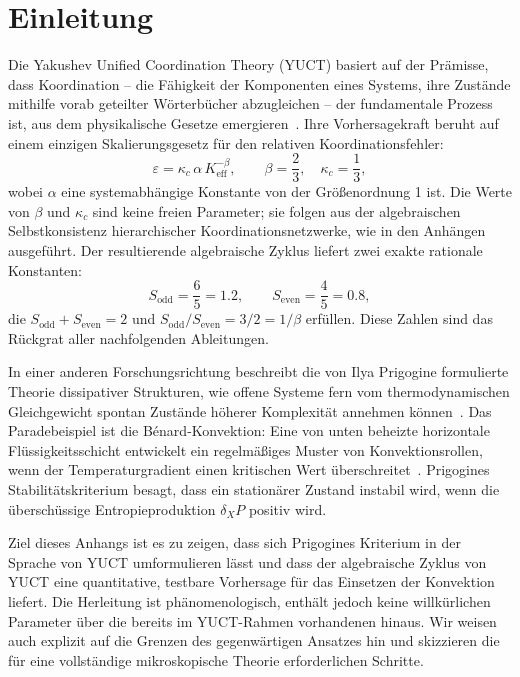 \documentclass[12pt,a4paper]{article}
\begin{document}
	\newpage
	\tableofcontents
	\newpage
	
	\section{Einleitung}
	
	Die Yakushev Unified Coordination Theory (YUCT) basiert auf der Prämisse, dass Koordination – die Fähigkeit der Komponenten eines Systems, ihre Zustände mithilfe vorab geteilter Wörterbücher abzugleichen – der fundamentale Prozess ist, aus dem physikalische Gesetze emergieren~\cite{Yakushev2026}. Ihre Vorhersagekraft beruht auf einem einzigen Skalierungsgesetz für den relativen Koordinationsfehler:
	\begin{equation}\label{eq:universal}
		\varepsilon = \kappa_c\,\alpha\, K_{\mathrm{eff}}^{-\beta},\qquad 
		\beta = \frac{2}{3},\quad \kappa_c = \frac{1}{3},
	\end{equation}
	wobei \(\alpha\) eine systemabhängige Konstante von der Größenordnung 1 ist. Die Werte von \(\beta\) und \(\kappa_c\) sind keine freien Parameter; sie folgen aus der algebraischen Selbstkonsistenz hierarchischer Koordinationsnetzwerke, wie in den Anhängen~\cite{AppendixY, AppendixL, AppendixFerra, AppendixAF} ausgeführt. Der resultierende algebraische Zyklus liefert zwei exakte rationale Konstanten:
	\begin{equation}\label{eq:S-constants}
		S_{\mathrm{odd}} = \frac{6}{5} = 1.2,\qquad
		S_{\mathrm{even}} = \frac{4}{5} = 0.8,
	\end{equation}
	die \(S_{\mathrm{odd}} + S_{\mathrm{even}} = 2\) und \(S_{\mathrm{odd}}/S_{\mathrm{even}} = 3/2 = 1/\beta\) erfüllen. Diese Zahlen sind das Rückgrat aller nachfolgenden Ableitungen.
	
	In einer anderen Forschungsrichtung beschreibt die von Ilya Prigogine formulierte Theorie dissipativer Strukturen, wie offene Systeme fern vom thermodynamischen Gleichgewicht spontan Zustände höherer Komplexität annehmen können~\cite{Prigogine1977, Glansdorff1971}. Das Paradebeispiel ist die Bénard-Konvektion: Eine von unten beheizte horizontale Flüssigkeitsschicht entwickelt ein regelmäßiges Muster von Konvektionsrollen, wenn der Temperaturgradient einen kritischen Wert überschreitet~\cite{Chandrasekhar1961}. Prigogines Stabilitätskriterium besagt, dass ein stationärer Zustand instabil wird, wenn die überschüssige Entropieproduktion \(\delta_X P\) positiv wird.
	
	Ziel dieses Anhangs ist es zu zeigen, dass sich Prigogines Kriterium in der Sprache von YUCT umformulieren lässt und dass der algebraische Zyklus von YUCT eine quantitative, testbare Vorhersage für das Einsetzen der Konvektion liefert. Die Herleitung ist phänomenologisch, enthält jedoch keine willkürlichen Parameter über die bereits im YUCT-Rahmen vorhandenen hinaus. Wir weisen auch explizit auf die Grenzen des gegenwärtigen Ansatzes hin und skizzieren die für eine vollständige mikroskopische Theorie erforderlichen Schritte.
	
\end{document}
